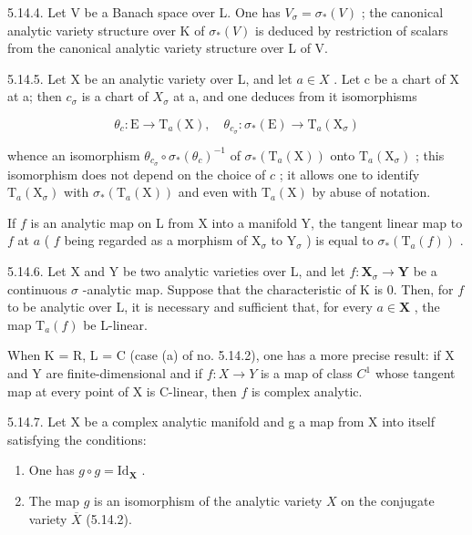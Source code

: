 5.14.4. Let V be a Banach space over L. One has \(V_{\sigma} = \sigma_{*}(V)\) ; the canonical analytic variety structure over K of \(\sigma_{*}(V)\) is deduced by restriction of scalars from the canonical analytic variety structure over L of V.

5.14.5. Let X be an analytic variety over L, and let \(a \in X\) . Let c be a chart of X at a; then \(c_{\sigma}\) is a chart of \(X_{\sigma}\) at a, and one deduces from it isomorphisms

\[
\theta_ {c} \colon \mathrm{E} \rightarrow \mathrm{T} _ {a} (\mathrm{X}), \quad \theta_ {c _ {\sigma}} \colon \sigma_ {*} (\mathrm{E}) \rightarrow \mathrm{T} _ {a} (\mathrm{X} _ {\sigma})
\]

whence an isomorphism \(\theta_{c_{\sigma}} \circ \sigma_{*}(\theta_{c})^{-1}\) of \(\sigma_{*}(\mathrm{T}_{a}(\mathrm{X}))\) onto \(\mathrm{T}_{a}(\mathrm{X}_{\sigma})\) ; this isomorphism does not depend on the choice of \(c\) ; it allows one to identify \(\mathrm{T}_{a}(\mathrm{X}_{\sigma})\) with \(\sigma_{*}(\mathrm{T}_{a}(\mathrm{X}))\) and even with \(\mathrm{T}_{a}(\mathrm{X})\) by abuse of notation.

If \(f\) is an analytic map on L from X into a manifold Y, the tangent linear map to \(f\) at \(a\) ( \(f\) being regarded as a morphism of \(\mathrm{X}_{\sigma}\) to \(\mathrm{Y}_{\sigma}\) ) is equal to \(\sigma_{*}(\mathrm{T}_{a}(f))\) .

5.14.6. Let X and Y be two analytic varieties over L, and let \(f: \mathbf{X}_{\sigma} \to \mathbf{Y}\) be a continuous \(\sigma\) -analytic map. Suppose that the characteristic of K is 0. Then, for \(f\) to be analytic over L, it is necessary and sufficient that, for every \(a \in \mathbf{X}\) , the map \(\mathrm{T}_{a}(f)\) be L-linear.

When K = R, L = C (case (a) of no. 5.14.2), one has a more precise result: if X and Y are finite-dimensional and if \(f: X \to Y\) is a map of class \(C^{1}\) whose tangent map at every point of X is C-linear, then \(f\) is complex analytic.

5.14.7. Let X be a complex analytic manifold and g a map from X into itself satisfying the conditions:

\begin{enumerate}
\def\labelenumi{(\roman{enumi})}
\item
  One has \(g \circ g = \mathrm{Id}_{\mathbf{X}}\) .
\item
  The map \(g\) is an isomorphism of the analytic variety \(X\) on the conjugate variety \(\overline{X}\) (5.14.2).
\end{enumerate}

